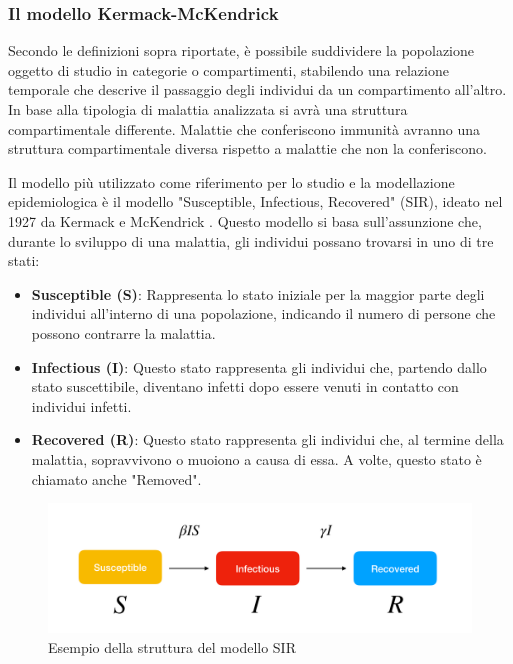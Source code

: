 \subsubsection{Il modello Kermack-McKendrick}

Secondo le definizioni sopra riportate, è possibile suddividere la 
popolazione oggetto di studio in categorie o compartimenti, stabilendo 
una relazione temporale che descrive il passaggio degli individui da un 
compartimento all'altro. In base alla tipologia di malattia analizzata
si avrà una struttura compartimentale differente. Malattie che conferiscono 
immunità avranno una struttura compartimentale diversa rispetto a 
malattie che non la conferiscono.

Il modello più utilizzato come riferimento per lo studio e la 
modellazione epidemiologica è il modello "Susceptible, Infectious, 
Recovered" (SIR), ideato nel 1927 da Kermack e McKendrick \cite{kermack1927contribution}. 
Questo modello si basa sull'assunzione che, durante lo sviluppo di una 
malattia, gli individui possano trovarsi in uno di tre stati:

\begin{itemize}
    \item \textbf{Susceptible (S)}: Rappresenta lo stato iniziale per la maggior parte degli individui all'interno di una popolazione, indicando il numero di persone che possono contrarre la malattia.
    \item \textbf{Infectious (I)}: Questo stato rappresenta gli individui che, partendo dallo stato suscettibile, diventano infetti dopo essere venuti in contatto con individui infetti.
    \item \textbf{Recovered (R)}: Questo stato rappresenta gli individui che, al termine della malattia, sopravvivono o muoiono a causa di essa. A volte, questo stato è chiamato anche "Removed".
\end{itemize}

\begin{figure}[H]
    \begin{center}
        \includegraphics[width=\linewidth]{img/sir.png}
        \caption{Esempio della struttura del modello SIR} 
        \label{fig:SIR_Structure}
    \end{center}
\end{figure}

